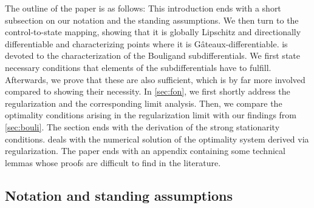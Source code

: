 \documentclass[reqno]{shinyart}
\begin{document}
The outline of the paper is as follows:
This introduction ends with a short subsection on our notation and the standing assumptions.
We then turn to the control-to-state mapping, showing that it is globally Lipschitz and directionally differentiable
and characterizing  points where it is G\^ateaux-differentiable. 
 is devoted to the characterization of the Bouligand subdifferentials. 
We first state necessary conditions that elements of the subdifferentials have to fulfill. 
Afterwards, we prove that these are also sufficient, which is by far more involved compared to 
showing their necessity. 
In \cref{sec:fon}, we first shortly address the regularization and the corresponding limit analysis. 
Then, we compare the 
optimality conditions arising in the regularization limit with our findings from \cref{sec:bouli}. 
The section ends with the derivation of the strong stationarity conditions.
 deals with the numerical solution of the optimality system derived via regularization. 
The paper ends with an appendix containing some technical lemmas whose proofs are difficult to find in the literature.

\subsection{Notation and standing assumptions}
\end{document}
